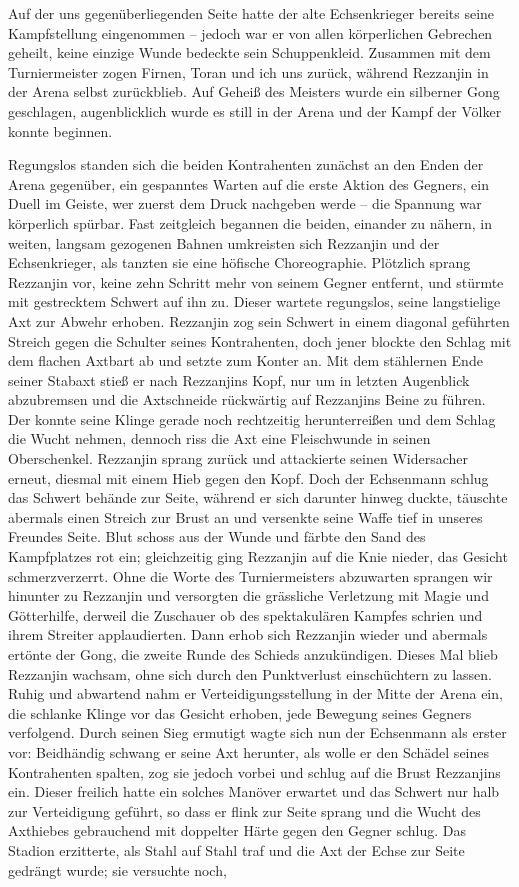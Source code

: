 Auf der uns gegenüberliegenden Seite hatte der alte Echsenkrieger bereits seine Kampfstellung eingenommen -- jedoch war er von allen körperlichen Gebrechen geheilt, keine einzige Wunde bedeckte sein Schuppenkleid. Zusammen mit dem Turniermeister zogen Firnen, Toran und ich uns zurück, während Rezzanjin in der Arena selbst zurückblieb. Auf Geheiß des Meisters wurde ein silberner Gong geschlagen, augenblicklich wurde es still in der Arena und der Kampf der Völker konnte beginnen.

Regungslos standen sich die beiden Kontrahenten zunächst an den Enden der Arena gegenüber, ein gespanntes Warten auf die erste Aktion des Gegners, ein Duell im Geiste, wer zuerst dem Druck nachgeben werde -- die Spannung war körperlich spürbar. Fast zeitgleich begannen die beiden, einander zu nähern, in weiten, langsam gezogenen Bahnen umkreisten sich Rezzanjin und der Echsenkrieger, als tanzten sie eine höfische Choreographie. Plötzlich sprang Rezzanjin vor, keine zehn Schritt mehr von seinem Gegner entfernt, und stürmte mit gestrecktem Schwert auf ihn zu. Dieser wartete regungslos, seine langstielige Axt zur Abwehr erhoben. Rezzanjin zog sein Schwert in einem diagonal geführten Streich gegen die Schulter seines Kontrahenten, doch jener blockte den Schlag mit dem flachen Axtbart ab und setzte zum Konter an. Mit dem stählernen Ende seiner Stabaxt stieß er nach Rezzanjins Kopf, nur um in letzten Augenblick abzubremsen und die Axtschneide rückwärtig auf Rezzanjins Beine zu führen. Der konnte seine Klinge gerade noch rechtzeitig herunterreißen und dem Schlag die Wucht nehmen, dennoch riss die Axt eine Fleischwunde in seinen Oberschenkel. Rezzanjin sprang zurück und attackierte seinen Widersacher erneut, diesmal mit einem Hieb gegen den Kopf. Doch der Echsenmann schlug das Schwert behände zur Seite, während er sich darunter hinweg duckte, täuschte abermals einen Streich zur Brust an und versenkte seine Waffe tief in unseres Freundes Seite. Blut schoss aus der Wunde und färbte den Sand des Kampfplatzes rot ein; gleichzeitig ging Rezzanjin auf die Knie nieder, das Gesicht schmerzverzerrt. Ohne die Worte des Turniermeisters abzuwarten sprangen wir hinunter zu Rezzanjin und versorgten die grässliche Verletzung mit Magie und Götterhilfe, derweil die Zuschauer ob des spektakulären Kampfes schrien und ihrem Streiter applaudierten. Dann erhob sich Rezzanjin wieder und abermals ertönte der Gong, die zweite Runde des Schieds anzukündigen. Dieses Mal blieb Rezzanjin wachsam, ohne sich durch den Punktverlust einschüchtern zu lassen. Ruhig und abwartend nahm er Verteidigungsstellung in der Mitte der Arena ein, die schlanke Klinge vor das Gesicht erhoben, jede Bewegung seines Gegners verfolgend. Durch seinen Sieg ermutigt wagte sich nun der Echsenmann als erster vor: Beidhändig schwang er seine Axt herunter, als wolle er den Schädel seines Kontrahenten spalten, zog sie jedoch vorbei und schlug auf die Brust Rezzanjins ein. Dieser freilich hatte ein solches Manöver erwartet und das Schwert nur halb zur Verteidigung geführt, so dass er flink zur Seite sprang und die Wucht des Axthiebes gebrauchend mit doppelter Härte gegen den Gegner schlug. Das Stadion erzitterte, als Stahl auf Stahl traf und die Axt der Echse zur Seite gedrängt wurde; sie versuchte noch, 